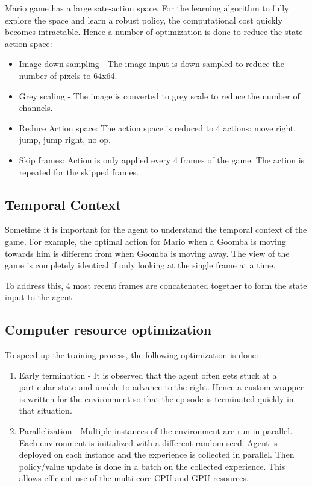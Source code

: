 \documentclass[conference]{IEEEtran}
\begin{document}
Mario game has a large sate-action space. For the learning algorithm to fully explore the space and learn a robust policy, the computational cost quickly becomes intractable. Hence a number of optimization is done to reduce the state-action space:

\begin{itemize}
    \item Image down-sampling - The image input is down-sampled to reduce the number of pixels to 64x64.
    \item Grey scaling - The image is converted to grey scale to reduce the number of channels.
    \item Reduce Action space: The action space is reduced to 4 actions: move right, jump, jump right, no op.
    \item Skip frames: Action is only applied every 4 frames of the game. The action is repeated for the skipped frames.
\end{itemize}

\subsection{Temporal Context}

Sometime it is important for the agent to understand the temporal context of the game. For example, the optimal action for Mario when a Goomba is moving towards him is different from when Goomba is moving away. The view of the game is completely identical if only looking at the single frame at a time.

To address this, 4 most recent frames are concatenated together to form the state input to the agent.

\subsection{Computer resource optimization}

To speed up the training process, the following optimization is done:
\begin{enumerate}
    \item Early termination - It is observed that the agent often gets stuck at a particular state and unable to advance to the right. Hence a custom wrapper is written for the environment so that the episode is terminated quickly in that situation.
    \item Parallelization - Multiple instances of the environment are run in parallel. Each environment is initialized with a different random seed. Agent is deployed on each instance and the experience is collected in parallel. Then policy/value update is done in a batch on the collected experience. This allows efficient use of the multi-core CPU and GPU resources.
\end{enumerate}
\end{document}
